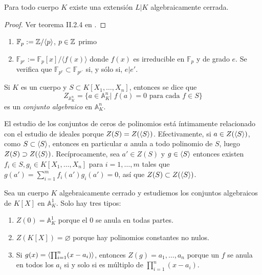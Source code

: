 \documentclass[./main.tex]{subfiles}
\begin{document}
\begin{proposition}
Para todo cuerpo $K$ existe una extensión $L|K$ algebraicamente cerrada.
\end{proposition}
\begin{proof}
Ver teorema II.2.4 en \cite{gamboa}.
\end{proof}

\begin{example}
\begin{enumerate}
  \item $\mathbb{F}_p:=\mathbb{Z}/\langle p\rangle$, $p\in\mathbb{Z}$ primo
  \item $\mathbb{F}_{p^e}:=\mathbb{F}_p[x]/\langle f(x)\rangle$ donde $f(x)$ es irreducible en $\mathbb{F}_p$ y de grado $e$. Se verifica que $\mathbb{F}_{p^{e}}\subset\mathbb{F}_{p^{e'}}$ si, y sólo si, $e|e'$.
\end{enumerate}
\end{example}

\begin{definition}
Si $K$ es un cuerpo y $S\subset K[X_1, \dots, X_n]$, entonces se dice que
\[Z_{\mathbb A^n_K} = \{a \in \mathbb A^n_K \big \vert \; f(a) = 0 \text{ para cada } f\in S \} \]
es un \emph{conjunto algebraico} en $\mathbb A^n_K$.
\end{definition}

El estudio de los conjuntos de ceros de polinomios está íntimamente relacionado con el estudio de ideales porque $Z ( S) = Z ( \langle S \rangle )$. Efectivamente, si $a\in Z(\langle S \rangle)$, como $S \subset \langle S \rangle$, entonces en particular $a$ anula a todo polinomio de $S$, luego $Z ( S) \supset Z ( \langle S \rangle )$. Recíprocamente, sea $a'\in Z(S)$ y $g \in \langle S \rangle$ entonces existen $f_i\in S, g_i \in K[X_1,\dots, X_n]$ para $i = 1,\dots, m$ tales que $g(a') = \sum_{i=1}^m f_i(a')g_i(a') = 0$, así que $Z ( S) \subset Z ( \langle S \rangle )$.

\begin{example}
Sea un cuerpo $K$ algebraicamente cerrado y estudiemos los conjuntos algebraicos de $K[X]$ en $\mathbb A^1_K$. Solo hay tres tipos:
\begin{enumerate}
    \item $ Z(0) = \mathbb A^1_K$ porque el $0$ se anula en todas partes.
    \item $Z(K[X]) = \varnothing$ porque hay polinomios constantes no nulos.
    \item Si $g(x) = \langle \prod_{i=1}^n (x - a_i) \rangle$, entonces $ Z(g) = {a_1,\dots, a_n}$ porque un $f$ se anula en todos los $a_i$ si y solo si es múltiplo de $\prod_{i=1}^n (x-a_i)$.
\end{enumerate}
\end{example}
\end{document}
